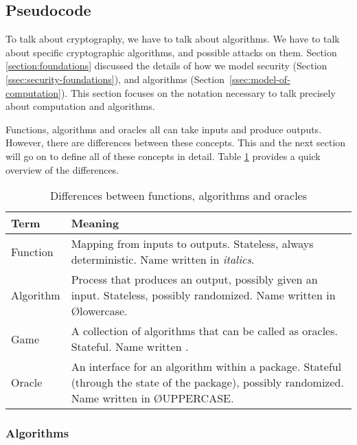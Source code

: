 \subsection{Pseudocode}\label{ssec:pseudocode-defs}
To talk about cryptography, we have to talk about algorithms. We have to talk about specific cryptographic algorithms, and possible attacks on them. Section \ref{section:foundations} discussed the details of how we model security (Section \ref{ssec:security-foundations}), and algorithms (Section~\ref{ssec:model-of-computation}). This section focuses on the notation necessary to talk precisely about computation and algorithms.

Functions, algorithms and oracles all can take inputs and produce outputs. However, there are differences between these concepts. This and the next section will go on to define all of these concepts in detail. Table \ref{table:functions-algorithms-oracles} provides a quick overview of the differences.

\begin{table}
  \begin{center}
    \begin{tabular}{l|p{11cm}}
      Term      & Meaning                                                                                                                                          \\ \hline
      Function  & Mapping from inputs to outputs. Stateless, always deterministic. Name written in \emph{italics}.                                                 \\
      Algorithm & Process that produces an output, possibly given an input. Stateless, possibly randomized. Name written in \O{lowercase}.                         \\
      Game      & A collection of algorithms that can be called as oracles. Stateful. Name written \M{Capitalized}.                                                \\
      Oracle    & An interface for an algorithm within a package. Stateful (through the state of the package), possibly randomized. Name written in \O{UPPERCASE}. \\
    \end{tabular}
  \end{center}
  \caption{Differences between functions, algorithms and oracles}\label{table:functions-algorithms-oracles}
\end{table}

\subsubsection{Algorithms}

